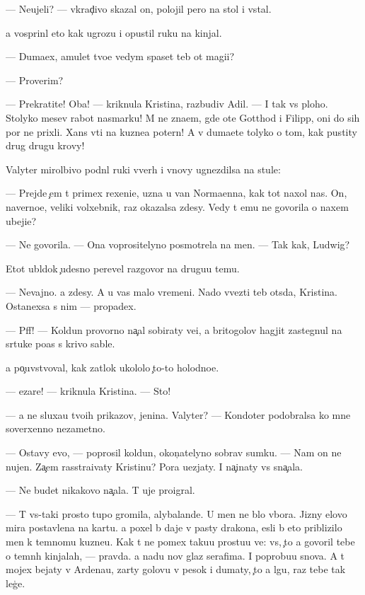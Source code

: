 \documentclass[10pt]{book}
\begin{document}
— Neujeli? — vkrad{\c}ivo skazal on, polojil pero na stol i vstal.

{\Y}a vosprin{\ia}l eto kak ugrozu i opustil ruku na kinjal.

— Duma{\y}ex, amulet tvo{\y}e{\y} vedym{\yi} spaset teb{\ia} ot magi{\y}i?

— Proverim?

— Prekratite! Oba! — kriknula Kristina, razbudiv Adil{\ia}. — I tak vs{\e} ploho. Stolyko mes{\ia}{\q}ev rabot{\yi} nasmarku! M{\yi} ne zna{\y}em, gde ote{\q} Gotthod i Filipp, oni do sih por ne prixli. Xans v{\yi}{\y}ti na kuzne{\q}a poter{\ia}n! A v{\yi} duma{\y}ete tolyko o tom, kak pustity drug drugu krovy!

Valyter mirol{\iu}bivo podn{\ia}l ruki vverh i vnovy ugnezdilsa na stule:

— Prejde {\c}em t{\yi} primex rexeni{\y}e, uzna{\y} u van Norma{\y}enna, kak tot naxol nas. On, naverno{\y}e, veliki{\y} volxebnik, raz okazalsa zdesy. Vedy t{\yi} {\y}emu ne govorila o naxem ubeji{\x}e?

— Ne govorila. — Ona voprositelyno posmotrela na men{\ia}. — Tak kak, Ludwig?

Etot ubl{\iu}dok {\c}udesno perevel razgovor na drugu{\y}u temu.

— Nevajno. {\Y}a zdesy. A u vas malo vremeni. Nado v{\yi}vezti teb{\ia} ots{\iu}da, Kristina. Ostanexsa s nim — propadex.

— Pff! — Koldun provorno na{\c}al sobiraty ve{\x}i, a britogolov{\yi}{\y} hagjit zastegnul na s{\iu}rtuke po{\y}as s krivo{\y} sable{\y}.

{\Y}a po{\c}uvstvoval, kak zat{\yi}lok ukololo {\c}to-to holodno{\y}e.

— {\C}ezare! — kriknula Kristina. — Sto{\y}!

— {\Y}a ne sluxa{\y}u tvo{\y}ih prikazov, jen{\x}ina. Valyter? — Kondot{\y}er podobralsa ko mne soverxenno nezametno.

— Ostavy {\y}evo, — poprosil koldun, okon{\c}atelyno sobrav sumku. — Nam on ne nujen. Za{\c}em rasstra{\y}ivaty Kristinu? Pora u{\y}ezjaty. I na{\c}inaty vs{\e} sna{\c}ala.

— Ne budet nikakovo na{\c}ala. T{\yi} uje proigral.

— T{\yi} vs{\e}-taki prosto tupo{\y} gromila, alybalande{\q}. U men{\ia} ne b{\yi}lo v{\yi}bora. Jizny {\q}elovo mira postavlena na kartu. {\Y}a poxel b{\yi} daje v pasty drakona, {\y}esli b{\yi} eto priblizilo men{\ia} k temnomu kuzne{\q}u. Kak t{\yi} ne po{\y}mex taku{\y}u prostu{\y}u ve{\x}: vs{\e}, {\c}to {\y}a govoril tebe o temn{\yi}h kinjalah, — pravda. {\Y}a na{\y}du nov{\yi}{\y} glaz serafima. I poprobu{\y}u snova. A t{\yi} mojex bejaty v Ardenau, zar{\yi}ty golovu v pesok i dumaty, {\c}to {\y}a lgu, raz tebe tak leg{\c}e.
\end{document}
